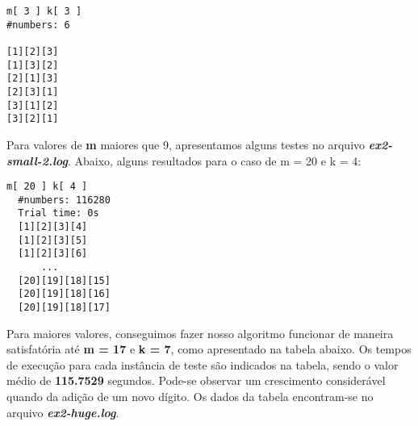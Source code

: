 \documentclass[twoside]{article}
\begin{document}
\begin{multicols}{2}
\begin{lstlisting}
m[ 3 ] k[ 3 ]
#numbers: 6

[1][2][3]
[1][3][2]
[2][1][3]
[2][3][1]
[3][1][2]
[3][2][1]
\end{lstlisting}

\indent Para valores de \textbf{m} maiores que 9, apresentamos alguns testes no arquivo \textbf{\textit{ex2-small-2.log}}. Abaixo, alguns resultados para o caso de m = 20 e k = 4:

\begin{lstlisting}
m[ 20 ] k[ 4 ]
  #numbers: 116280
  Trial time: 0s
  [1][2][3][4]
  [1][2][3][5]
  [1][2][3][6]
      ...
  [20][19][18][15]
  [20][19][18][16]
  [20][19][18][17]
\end{lstlisting}

\indent Para maiores valores, conseguimos fazer nosso algoritmo funcionar de maneira satisfatória até \textbf{m = 17} e \textbf{k = 7}, como apresentado na tabela abaixo. Os tempos de execução para cada instância de teste são indicados na tabela, sendo o valor médio de \textbf{115.7529} segundos. Pode-se observar um crescimento considerável quando da adição de um novo dígito. Os dados da tabela encontram-se no arquivo \textbf{\textit{ex2-huge.log}}.\\


\end{multicols}
\end{document}

